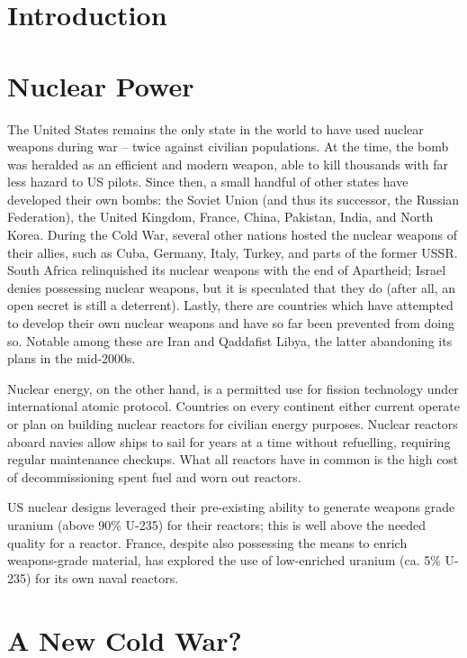\documentclass[letterpaper,12pt,twoside]{article} %
\begin{document}
\begin{multicols}{2}

\section*{Introduction}

\section{Nuclear Power}

The United States remains the only state in the world to have used nuclear weapons during war -- twice against civilian populations. At the time, the bomb was heralded as an efficient and modern weapon, able to kill thousands with far less hazard to US pilots. Since then, a small handful of other states have developed their own bombs: the Soviet Union (and thus its successor, the Russian Federation), the United Kingdom, France, China, Pakistan, India, and North Korea. During the Cold War, several other nations hosted the nuclear weapons of their allies, such as Cuba, Germany, Italy, Turkey, and parts of the former USSR. South Africa relinquished its nuclear weapons with the end of Apartheid; Israel denies possessing nuclear weapons, but it is speculated that they do (after all, an open secret is still a deterrent).  Lastly, there are countries which have attempted to develop their own nuclear weapons and have so far been prevented from doing so. Notable among these are Iran and Qaddafist Libya, the latter abandoning its plans in the mid-2000s.

Nuclear energy, on the other hand, is a permitted use for fission technology under international atomic protocol. Countries on every continent either current operate or plan on building nuclear reactors for civilian energy purposes. Nuclear reactors aboard navies allow ships to sail for years at a time without refuelling, requiring regular maintenance checkups. What all reactors have in common is the high cost of decommissioning spent fuel and worn out reactors.

US nuclear designs leveraged their pre-existing ability to generate weapons grade uranium (above 90\% U-235) for their reactors; this is well above the needed quality for a reactor. France, despite also possessing the means to enrich weapons-grade material, has explored the use of low-enriched uranium (ca. 5\% U-235) for its own naval reactors.

\section{A New Cold War?}


\end{multicols}
\end{document}
